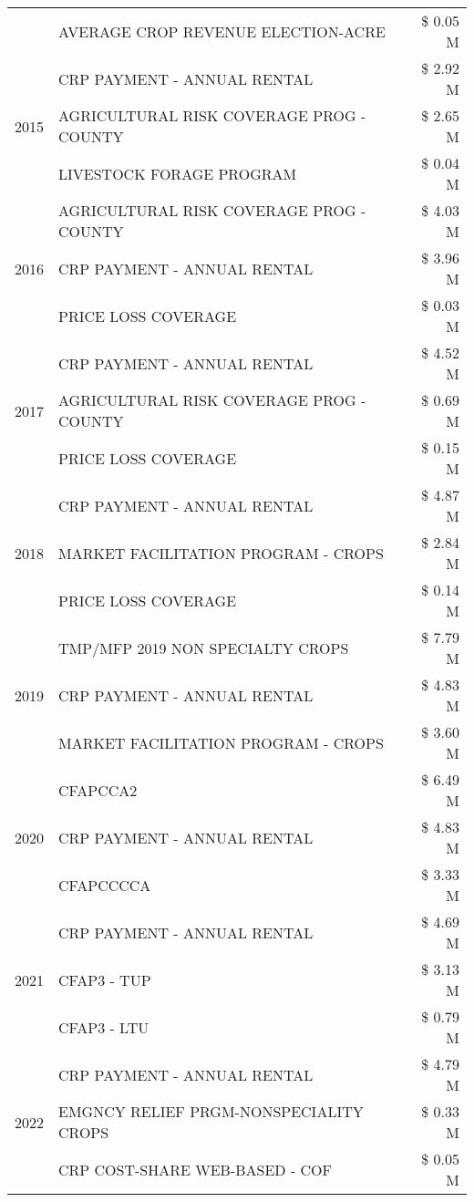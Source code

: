 \begin{tabular}{llr}
 & AVERAGE CROP REVENUE ELECTION-ACRE & \$ 0.05 M \\
\cline{1-3}
\multirow[t]{3}{*}{2015} & CRP PAYMENT - ANNUAL RENTAL & \$ 2.92 M \\
 & AGRICULTURAL RISK COVERAGE PROG - COUNTY & \$ 2.65 M \\
 & LIVESTOCK FORAGE PROGRAM & \$ 0.04 M \\
\cline{1-3}
\multirow[t]{3}{*}{2016} & AGRICULTURAL RISK COVERAGE PROG - COUNTY & \$ 4.03 M \\
 & CRP PAYMENT - ANNUAL RENTAL & \$ 3.96 M \\
 & PRICE LOSS COVERAGE & \$ 0.03 M \\
\cline{1-3}
\multirow[t]{3}{*}{2017} & CRP PAYMENT - ANNUAL RENTAL & \$ 4.52 M \\
 & AGRICULTURAL RISK COVERAGE PROG - COUNTY & \$ 0.69 M \\
 & PRICE LOSS COVERAGE & \$ 0.15 M \\
\cline{1-3}
\multirow[t]{3}{*}{2018} & CRP PAYMENT - ANNUAL RENTAL & \$ 4.87 M \\
 & MARKET FACILITATION PROGRAM - CROPS & \$ 2.84 M \\
 & PRICE LOSS COVERAGE & \$ 0.14 M \\
\cline{1-3}
\multirow[t]{3}{*}{2019} & TMP/MFP 2019 NON SPECIALTY CROPS & \$ 7.79 M \\
 & CRP PAYMENT - ANNUAL RENTAL & \$ 4.83 M \\
 & MARKET FACILITATION PROGRAM - CROPS & \$ 3.60 M \\
\cline{1-3}
\multirow[t]{3}{*}{2020} & CFAPCCA2 & \$ 6.49 M \\
 & CRP PAYMENT - ANNUAL RENTAL & \$ 4.83 M \\
 & CFAPCCCCA & \$ 3.33 M \\
\cline{1-3}
\multirow[t]{3}{*}{2021} & CRP PAYMENT - ANNUAL RENTAL & \$ 4.69 M \\
 & CFAP3 - TUP & \$ 3.13 M \\
 & CFAP3 - LTU & \$ 0.79 M \\
\cline{1-3}
\multirow[t]{3}{*}{2022} & CRP PAYMENT - ANNUAL RENTAL & \$ 4.79 M \\
 & EMGNCY RELIEF PRGM-NONSPECIALITY CROPS & \$ 0.33 M \\
 & CRP COST-SHARE WEB-BASED - COF & \$ 0.05 M \\
\cline{1-3}
\bottomrule
\end{tabular}

